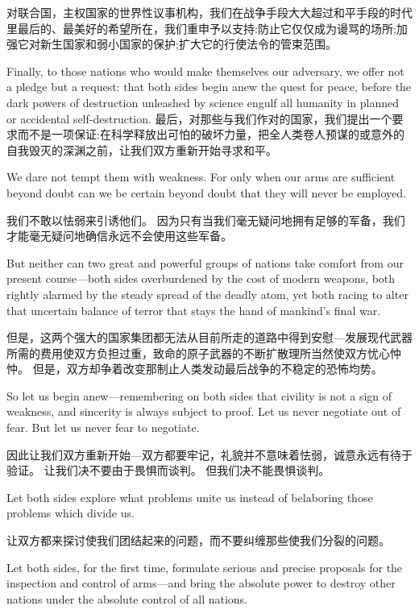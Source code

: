 \documentclass[cs4size, a4paper, 12pt]{article}
\newcounter{numpar}
\newcommand*{\newpar}{\numpar{}}
\begin{document}
	对联合国，主权国家的世界性议事机构，我们在战争手段大大超过和平手段的时代里最后的、最美好的希望所在，我们重申予以支持:防止它仅仅成为谩骂的场所;加强它对新生国家和弱小国家的保护;扩大它的行使法令的管束范围。 
	
	\newpar Finally, to those nations who would make themselves our adversary, we offer not a pledge but a request: that both sides begin anew the quest for peace, before the dark powers of destruction unleashed by science engulf all humanity in planned or accidental self-destruction. 最后，对那些与我们作对的国家，我们提出一个要求而不是一项保证:在科学释放出可怕的破坏力量，把全人类卷人预谋的或意外的自我毁灭的深渊之前，让我们双方重新开始寻求和平。 
	
	\newpar We dare not tempt them with weakness. For only when our arms are sufficient beyond doubt can we be certain beyond doubt that they will never be employed.
	
	我们不敢以怯弱来引诱他们。 因为只有当我们毫无疑问地拥有足够的军备，我们才能毫无疑问地确信永远不会使用这些军备。 
	
	\newpar But neither can two great and powerful groups of nations take comfort from our present course—both sides overburdened by the cost of modern weapons, both rightly alarmed by the steady spread of the deadly atom, yet both racing to alter that uncertain balance of terror that stays the hand of mankind's final war.
	
	但是，这两个强大的国家集团都无法从目前所走的道路中得到安慰—发展现代武器所需的费用使双方负担过重，致命的原子武器的不断扩散理所当然使双方忧心忡忡。 但是，双方却争着改变那制止人类发动最后战争的不稳定的恐怖均势。 
	
	\newpar So let us begin anew—remembering on both sides that civility is not a sign of weakness, and sincerity is always subject to proof. Let us never negotiate out of fear. But let us never fear to negotiate.
	
	因此让我们双方重新开始—双方都要牢记，礼貌并不意味着怯弱，诚意永远有待于验证。 让我们决不要由于畏惧而谈判。 但我们决不能畏惧谈判。 
	
	\newpar Let both sides explore what problems unite us instead of belaboring those problems which divide us.
	
	让双方都来探讨使我们团结起来的问题，而不要纠缠那些使我们分裂的问题。 
	
	\newpar Let both sides, for the first time, formulate serious and precise proposals for the inspection and control of arms—and bring the absolute power to destroy other nations under the absolute control of all nations.
	
\end{document}
